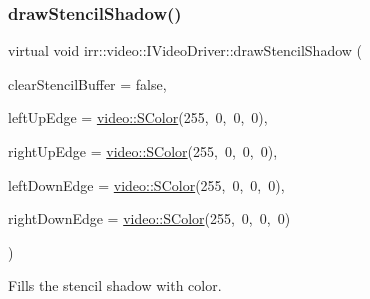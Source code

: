 \subsubsection{\texorpdfstring{draw\+Stencil\+Shadow()}{drawStencilShadow()}\hspace{0.1cm}{\footnotesize\ttfamily [2/2]}}
{\footnotesize\ttfamily virtual void irr\+::video\+::\+I\+Video\+Driver\+::draw\+Stencil\+Shadow (\begin{DoxyParamCaption}\item[{bool}]{clear\+Stencil\+Buffer = {\ttfamily false},  }\item[{\hyperlink{classirr_1_1video_1_1SColor}{video\+::\+S\+Color}}]{left\+Up\+Edge = {\ttfamily \hyperlink{classirr_1_1video_1_1SColor}{video\+::\+S\+Color}(255,~0,~0,~0)},  }\item[{\hyperlink{classirr_1_1video_1_1SColor}{video\+::\+S\+Color}}]{right\+Up\+Edge = {\ttfamily \hyperlink{classirr_1_1video_1_1SColor}{video\+::\+S\+Color}(255,~0,~0,~0)},  }\item[{\hyperlink{classirr_1_1video_1_1SColor}{video\+::\+S\+Color}}]{left\+Down\+Edge = {\ttfamily \hyperlink{classirr_1_1video_1_1SColor}{video\+::\+S\+Color}(255,~0,~0,~0)},  }\item[{\hyperlink{classirr_1_1video_1_1SColor}{video\+::\+S\+Color}}]{right\+Down\+Edge = {\ttfamily \hyperlink{classirr_1_1video_1_1SColor}{video\+::\+S\+Color}(255,~0,~0,~0)} }\end{DoxyParamCaption})\hspace{0.3cm}{\ttfamily [pure virtual]}}



Fills the stencil shadow with color. 

